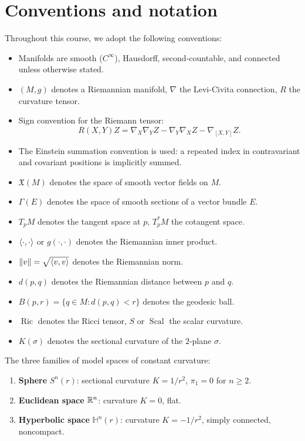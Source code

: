 \section*{Conventions and notation}

Throughout this course, we adopt the following conventions:
\begin{itemize}
    \item Manifolds are smooth ($C^\infty$), Hausdorff, second-countable, and
          connected unless otherwise stated.
    \item $(M, g)$ denotes a Riemannian manifold, $\nabla$ the Levi-Civita
          connection, $R$ the curvature tensor.
    \item Sign convention for the Riemann tensor:
          \[
              R(X,Y)Z = \nabla_X \nabla_Y Z - \nabla_Y \nabla_X Z - \nabla_{[X,Y]} Z.
          \]
    \item The Einstein summation convention is used: a repeated index in
          contravariant and covariant positions is implicitly summed.
    \item $\mathfrak{X}(M)$ denotes the space of smooth vector fields on $M$.
    \item $\Gamma(E)$ denotes the space of smooth sections of a vector bundle $E$.
    \item $T_pM$ denotes the tangent space at $p$, $T^*_pM$ the cotangent space.
    \item $\langle \cdot, \cdot \rangle$ or $g(\cdot,\cdot)$ denotes the Riemannian inner product.
    \item $\left\| v \right\| = \sqrt{\langle v, v \rangle}$ denotes the Riemannian norm.
    \item $d(p,q)$ denotes the Riemannian distance between $p$ and $q$.
    \item $B(p,r) = \{q \in M : d(p,q) < r\}$ denotes the geodesic ball.
    \item $\operatorname{Ric}$ denotes the Ricci tensor, $S$ or $\operatorname{Scal}$
          the scalar curvature.
    \item $K(\sigma)$ denotes the sectional curvature of the $2$-plane $\sigma$.
\end{itemize}

\begin{keyformulas}[title=\textbf{Reference model spaces}]
The three families of model spaces of constant curvature:
\begin{enumerate}
    \item \textbf{Sphere} $S^n(r)$: sectional curvature $K = 1/r^2$,
          $\pi_1 = 0$ for $n \geq 2$.
    \item \textbf{Euclidean space} $\mathbb{R}^n$: curvature $K = 0$, flat.
    \item \textbf{Hyperbolic space} $\mathbb{H}^n(r)$: curvature $K = -1/r^2$,
          simply connected, noncompact.
\end{enumerate}
\end{keyformulas}

